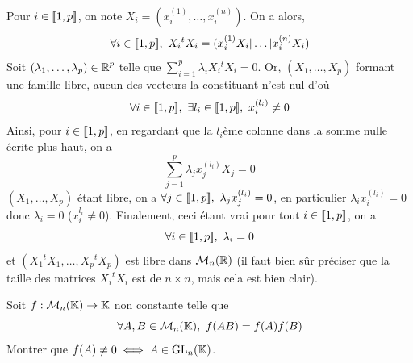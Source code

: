 \begin{solution}
    Pour $i\in[\![1,p]\!]$, on note $X_i=(x_i^{(1)},\dots,x_i^{(n)})$. On a alors, \[\forall i\in\inl1p,\ X_i{}^tX_i=(x_i^{(1)}X_i|\dots|x_i^{(n)}X_i)\]
    Soit $(\lambda_1,\dots,\lambda_p)\in\operatorname{\mathbb R}^p$ telle que $\sum_{i=1}^p\lambda_iX_i{}^tX_i=0$.
    Or, $(X_1,\dots,X_p)$ formant une famille libre, aucun des vecteurs la constituant n'est nul d'où
    \[\forall i\in[\![1,p]\!],\ \exists l_i\in[\![1,p]\!],\ x_i^{(l_i)}\neq 0\]
    Ainsi, pour $i\in[\![1,p]\!]$, en regardant que la $l_i$ème colonne dans la somme nulle écrite plus haut, 
    on a \[\sum_{j=1}^p\lambda_jx_j^{(l_i)}X_j=0\]
    $(X_1,\dots,X_p)$ étant libre, on a $\forall j\in\inl1p,\ \lambda_jx_j^{(l_i)}=0$, en particulier $\lambda_ix_i^{(l_i)}=0$
    donc $\lambda_i=0$ ($x_i^{l_i}\neq 0$). 
    Finalement, ceci étant vrai pour tout $i\in[\![1,p]\!]$, on a 
    \[\forall i\in[\![1,p]\!],\ \lambda_i=0\] et $(X_1{}^tX_1,\dots,X_p{}^tX_p)$ est libre dans $\mathcal M_n(\operatorname{\mathbb R})$
    (il faut bien sûr préciser que la taille des matrices $X_i{}^tX_i$ est de $n\times n$, mais cela est bien clair).
\end{solution}

\begin{exo}
    Soit $f:\mathcal M_n(\operatorname{\mathbb K})\to \operatorname{\mathbb K}$ non constante telle que 
    \[
        \forall A,B\in\mathcal M_n(\operatorname{\mathbb K}),\ f(AB)=f(A)f(B)    
    \]
    Montrer que $f(A)\neq 0\iff A\in\operatorname{GL}_n(\operatorname{\mathbb K})$.
\end{exo}
    
